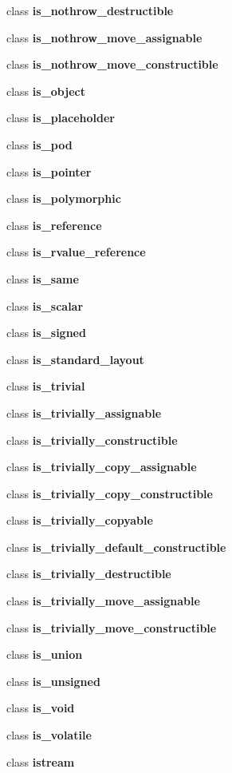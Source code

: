 \begin{DoxyCompactItemize}
\item 
class \textbf{ is\+\_\+nothrow\+\_\+destructible}
\item 
class \textbf{ is\+\_\+nothrow\+\_\+move\+\_\+assignable}
\item 
class \textbf{ is\+\_\+nothrow\+\_\+move\+\_\+constructible}
\item 
class \textbf{ is\+\_\+object}
\item 
class \textbf{ is\+\_\+placeholder}
\item 
class \textbf{ is\+\_\+pod}
\item 
class \textbf{ is\+\_\+pointer}
\item 
class \textbf{ is\+\_\+polymorphic}
\item 
class \textbf{ is\+\_\+reference}
\item 
class \textbf{ is\+\_\+rvalue\+\_\+reference}
\item 
class \textbf{ is\+\_\+same}
\item 
class \textbf{ is\+\_\+scalar}
\item 
class \textbf{ is\+\_\+signed}
\item 
class \textbf{ is\+\_\+standard\+\_\+layout}
\item 
class \textbf{ is\+\_\+trivial}
\item 
class \textbf{ is\+\_\+trivially\+\_\+assignable}
\item 
class \textbf{ is\+\_\+trivially\+\_\+constructible}
\item 
class \textbf{ is\+\_\+trivially\+\_\+copy\+\_\+assignable}
\item 
class \textbf{ is\+\_\+trivially\+\_\+copy\+\_\+constructible}
\item 
class \textbf{ is\+\_\+trivially\+\_\+copyable}
\item 
class \textbf{ is\+\_\+trivially\+\_\+default\+\_\+constructible}
\item 
class \textbf{ is\+\_\+trivially\+\_\+destructible}
\item 
class \textbf{ is\+\_\+trivially\+\_\+move\+\_\+assignable}
\item 
class \textbf{ is\+\_\+trivially\+\_\+move\+\_\+constructible}
\item 
class \textbf{ is\+\_\+union}
\item 
class \textbf{ is\+\_\+unsigned}
\item 
class \textbf{ is\+\_\+void}
\item 
class \textbf{ is\+\_\+volatile}
\item 
class \textbf{ istream}

\end{DoxyCompactItemize}
